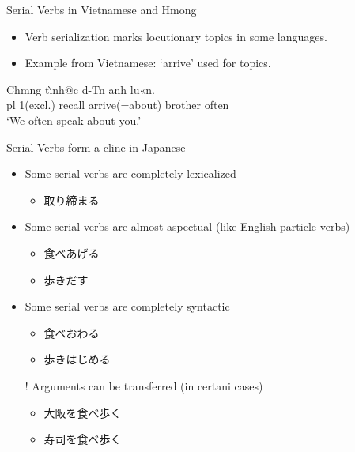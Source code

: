 \documentclass{beamer}
\begin{document}
\begin{frame}{Serial Verbs in Vietnamese and Hmong}
\begin{itemize}
    \item Verb serialization marks locutionary topics in some languages.
    \item Example from Vietnamese: ‘arrive’ used for topics.
\end{itemize}
\begin{exe}
\ex
\gll Chmng t\`\i nh@c d-Tn anh lu«n. \\
    pl 1(excl.) recall arrive(=about) brother often \\
\trans ‘We often speak about you.’ \\
\end{exe}
\end{frame}
\begin{frame}{Serial Verbs form a cline in Japanese}
  
\begin{itemize}
\item Some serial verbs are completely lexicalized
  \begin{itemize}
  \item 取り締まる 
  \end{itemize}
\item Some serial verbs are almost aspectual (like English particle verbs)
  \begin{itemize}
  \item 食べあげる 
  \item 歩きだす  
  \end{itemize}
\item Some serial verbs are completely syntactic
  \begin{itemize}
  \item 食べおわる 
  \item 歩きはじめる 
  \end{itemize}
\item [!] Arguments can be transferred (in certani cases)
  \begin{itemize}
  \item 大阪を食べ歩く 
  \item 寿司を食べ歩く 
  \end{itemize}
\end{itemize}
\citep{Hashimoto:Bond:2005}
\end{frame}
\end{document}
